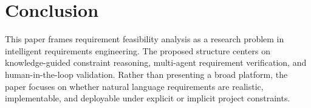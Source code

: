 \section{Conclusion}
\label{conclusion}

This paper frames requirement feasibility analysis as a research problem in intelligent requirements engineering.
The proposed structure centers on knowledge-guided constraint reasoning, multi-agent requirement verification, and human-in-the-loop validation.
Rather than presenting a broad platform, the paper focuses on whether natural language requirements are realistic, implementable, and deployable under explicit or implicit project constraints.
